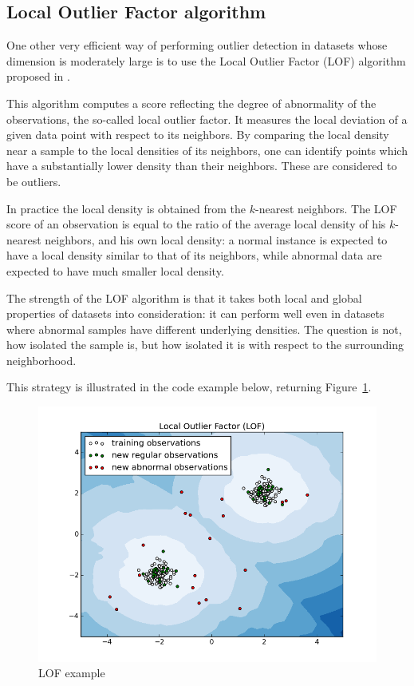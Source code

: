 \subsection{Local Outlier Factor algorithm}
\label{sec:lof}
One other very efficient way of performing outlier detection in datasets whose dimension is moderately large is to use the Local Outlier Factor (LOF) algorithm proposed in \cite{Breunig2000LOF}.

This algorithm computes a score reflecting the degree of abnormality of the observations, the so-called local outlier factor. It measures the local deviation of a given data point with respect to its neighbors. By comparing the local density near a sample to the local densities of its neighbors, one can identify points which have a substantially lower density than their neighbors. These are considered to be outliers.

In practice the local density is obtained from the $k$-nearest neighbors. The LOF score of an observation is equal to the ratio of the average local density of his $k$-nearest neighbors, and his own local density: a normal instance is expected to have a local density similar to that of its neighbors, while abnormal data are expected to have much smaller local density.

The strength of the LOF algorithm is that it takes both local and global properties of datasets into consideration: it can perform well even in datasets where abnormal samples have different underlying densities. The question is not, how isolated the sample is, but how isolated it is with respect to the surrounding neighborhood.

This strategy is illustrated in the code example below, returning Figure~\ref{fig:lof}.
\begin{figure}[!ht]
  \includegraphics[width=0.9\linewidth]{fig_source/lof}
  \caption{LOF example}
  \label{fig:lof}
\end{figure}

